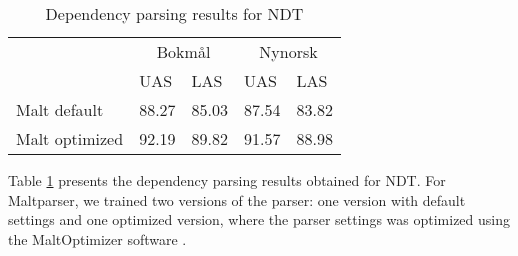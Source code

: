 \documentclass[11pt,a4paper]{article}
\begin{document}


\begin{table}
\centering
\begin{tabular}{lll|ll}
\hline
& \multicolumn{2}{c}{Bokm{\aa}l} & \multicolumn{2}{c}{Nynorsk}\\
 & UAS & LAS  & UAS & LAS \\\hline
Malt default & 88.27 & 85.03 & 87.54 & 83.82\\
Malt optimized & 92.19 & 89.82 & 91.57 & 88.98\\\hline
\end{tabular}
\caption{Dependency parsing results for NDT}
  \label{tb:parsing}
\end{table}

Table \ref{tb:parsing} presents the dependency parsing results
obtained for NDT.  For Maltparser, we trained two versions of the
parser: one version with default settings and one optimized version,
where the parser settings was optimized using the MaltOptimizer
software .


\clearpage

\end{document}
